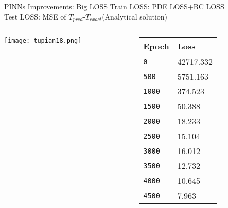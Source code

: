 \documentclass{beamer}
\begin{document}
\begin{frame}{PINNs Improvements: Big LOSS}
\small Train LOSS: PDE LOSS+BC LOSS
\small \\Test LOSS: MSE of $T_{pred}$-$T_{exact}$(Analytical solution)
    \begin{columns}
        \begin{column}{0.5\textwidth}
            \centering
            \texttt{[image: tupian18.png]} %
            \caption{Figure 5:Train and Test Loss Curves (Preliminary Results)}
        \end{column}

        \begin{column}{0.3\textwidth}
            \begin{table}[!htbp]
                \centering
                \begin{tabular}{l  | l}
                \hline
                    Epoch & Loss \\
                    \hline
                    \texttt{0}  & 42717.332 \\
                    \texttt{500} & 5751.163  \\
                    \texttt{1000}  & 374.523 \\
                    \texttt{1500}& 50.388 \\
                    \texttt{2000}& 18.233 \\
                    \texttt{2500}& 15.104 \\
                    \texttt{3000}& 16.012 \\
                    \texttt{3500}& 12.732 \\
                    \texttt{4000}& 10.645 \\
                    \texttt{4500}& 7.963 \\
                    \hline
                \end{tabular}
                \label{doc}
            \end{table}
        \end{column}
    \end{columns}
\end{frame}
\end{document}
